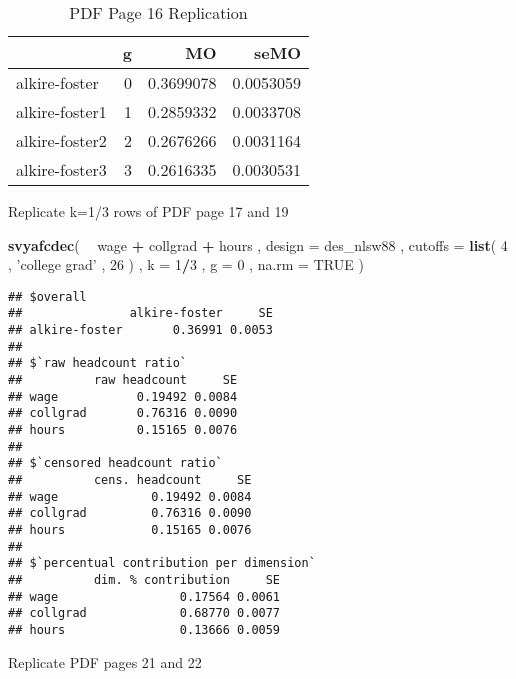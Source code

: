 \documentclass[]{book}
\newenvironment{Shaded}{\begin{snugshade}}{\end{snugshade}}
\newcommand{\DataTypeTok}[1]{\textcolor[rgb]{0.13,0.29,0.53}{#1}}
\newcommand{\DecValTok}[1]{\textcolor[rgb]{0.00,0.00,0.81}{#1}}
\newcommand{\KeywordTok}[1]{\textcolor[rgb]{0.13,0.29,0.53}{\textbf{#1}}}
\newcommand{\NormalTok}[1]{#1}
\newcommand{\OperatorTok}[1]{\textcolor[rgb]{0.81,0.36,0.00}{\textbf{#1}}}
\newcommand{\OtherTok}[1]{\textcolor[rgb]{0.56,0.35,0.01}{#1}}
\newcommand{\StringTok}[1]{\textcolor[rgb]{0.31,0.60,0.02}{#1}}
\begin{document}
\begin{table}

\caption{\label{tab:unnamed-chunk-63}PDF Page 16 Replication}
\centering
\begin{tabular}[t]{lrrr}
\toprule
  & g & MO & seMO\\
\midrule
alkire-foster & 0 & 0.3699078 & 0.0053059\\
alkire-foster1 & 1 & 0.2859332 & 0.0033708\\
alkire-foster2 & 2 & 0.2676266 & 0.0031164\\
alkire-foster3 & 3 & 0.2616335 & 0.0030531\\
\bottomrule
\end{tabular}
\end{table}

Replicate k=1/3 rows of PDF page 17 and 19

\begin{Shaded}
\begin{Highlighting}[]
\KeywordTok{svyafcdec}\NormalTok{(}
    \OperatorTok{~}\StringTok{ }\NormalTok{wage }\OperatorTok{+}\StringTok{ }\NormalTok{collgrad }\OperatorTok{+}\StringTok{ }\NormalTok{hours , }
    \DataTypeTok{design =}\NormalTok{ des_nlsw88 , }
    \DataTypeTok{cutoffs =} \KeywordTok{list}\NormalTok{( }\DecValTok{4}\NormalTok{ , }\StringTok{'college grad'}\NormalTok{ , }\DecValTok{26}\NormalTok{ ) , }
    \DataTypeTok{k =} \DecValTok{1}\OperatorTok{/}\DecValTok{3}\NormalTok{ , }
    \DataTypeTok{g =} \DecValTok{0}\NormalTok{ ,}
    \DataTypeTok{na.rm =} \OtherTok{TRUE}
\NormalTok{)}
\end{Highlighting}
\end{Shaded}

\begin{verbatim}
## $overall
##               alkire-foster     SE
## alkire-foster       0.36991 0.0053
## 
## $`raw headcount ratio`
##          raw headcount     SE
## wage           0.19492 0.0084
## collgrad       0.76316 0.0090
## hours          0.15165 0.0076
## 
## $`censored headcount ratio`
##          cens. headcount     SE
## wage             0.19492 0.0084
## collgrad         0.76316 0.0090
## hours            0.15165 0.0076
## 
## $`percentual contribution per dimension`
##          dim. % contribution     SE
## wage                 0.17564 0.0061
## collgrad             0.68770 0.0077
## hours                0.13666 0.0059
\end{verbatim}

Replicate PDF pages 21 and 22
\end{document}

